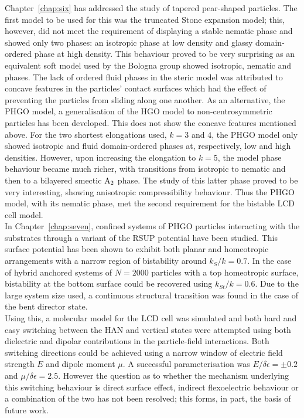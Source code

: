 Chapter~\ref{chap:six} has addressed the study of tapered pear-shaped particles. The first model to
be used for this was the truncated Stone expansion model; this, however, did not meet the 
requirement of
displaying a stable nematic phase and showed only two phases: an isotropic phase at low density
and glassy domain-ordered phase at high density. This behaviour proved to be very surprising as
an equivalent soft model used by the Bologna group showed isotropic, nematic and \smA phases. The
lack of ordered fluid phases in the steric model was attributed to concave features in
the particles' contact surfaces which had the effect of preventing the particles from sliding along
one another.
As an alternative, the PHGO model, a generalisation of the HGO model to non-centrosymmetric particles
has been developed. This does not show the concave features mentioned above. For the two shortest
elongations used, $k=3$ and $4$, the PHGO model only showed isotropic and fluid domain-ordered
phases at, respectively, low and high densities. However, upon increasing the elongation to $k=5$,
the model phase behaviour became much richer, with transitions from isotropic to nematic and
then to a bilayered smectic $\mathrm{A_2}$ phase. The study of this latter
phase proved to be very interesting, showing anisotropic compressibility behaviour. Thus the
PHGO model, with its nematic phase, met the second requirement for the bistable LCD cell
model.\\


In Chapter~\ref{chap:seven}, confined systems of PHGO particles interacting with the substrates
through a variant of the RSUP potential have been studied. This surface potential has been shown to
exhibit both planar and homeotropic arrangements with a narrow region of bistability around
$k_S/k=0.7$. In the case of hybrid anchored systems of $N=2000$ particles with a top homeotropic
surface, bistability at the bottom surface could be recovered using $k_{St}/k=0.6$. Due
to the large system size used, a continuous structural transition was found in the case of the bent
director state.\\ 
Using this, a molecular model for the LCD cell was simulated and both hard and easy 
switching between the HAN and vertical states were attempted using both dielectric and dipolar
contributions in the particle-field interactions. Both switching directions could be achieved 
using a narrow window of electric field strength $E$ and dipole moment $\mu$. A successful
parameterisation was $E/\delta\epsilon = \pm 0.2$ and $\mu/\delta\epsilon = 2.5$. However the
question as to  whether the mechanism underlying this switching behaviour is direct surface
effect, indirect flexoelectric behaviour or a combination of the two has not been resolved; 
this forms, in part, the basis of future work.








